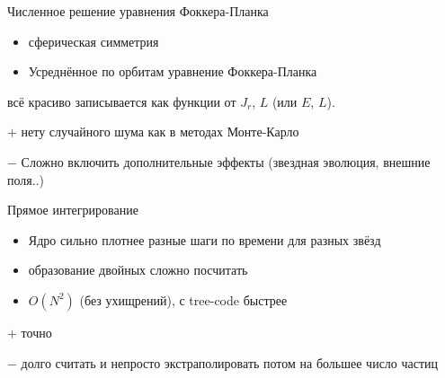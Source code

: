 \documentclass{beamer}
\begin{document}
    \begin{frame}{Численное решение уравнения Фоккера-Планка}
      \begin{itemize}
        \item сферическая симметрия
        \item Усреднённое по орбитам уравнение Фоккера-Планка
      \end{itemize} \so всё красиво записывается как функции от 
      $J_r$, $L$ (или $E$, $L$).

      \begin{exampleblock}{$+$}
        нету случайного шума как в методах Монте-Карло
      \end{exampleblock}
      \begin{alertblock}{$-$}
        Сложно включить дополнительные эффекты 
        (звездная эволюция, внешние поля..)
      \end{alertblock}
    \end{frame}

    \begin{frame}{Прямое интегрирование}
      \begin{itemize}
        \item Ядро сильно плотнее \so 
          разные шаги по времени для разных звёзд
        \item образование двойных сложно посчитать
        \item \alert{$O(N^2)$} (без ухищрений), с tree-code быстрее
      \end{itemize}

      \begin{exampleblock}{$+$}
        точно
      \end{exampleblock}
      \begin{alertblock}{$-$}
        долго считать и непросто экстраполировать 
        потом на большее число
        частиц
      \end{alertblock}
      
    \end{frame}
\end{document}
